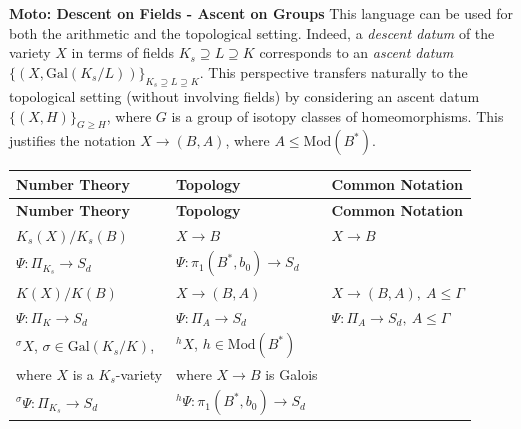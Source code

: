 \documentclass[10pt]{amsart}
\theoremstyle{definition}
\newcommand{\Gal}{{ \mathrm{Gal}}}
\begin{document}
\vspace{0.25 cm}

\textbf{Moto: Descent on Fields - Ascent on Groups} \newline
This language can be used for both the arithmetic and the topological setting. Indeed, a {\em descent datum} of the variety $X$ in terms of fields 
$K_s \supseteq L \supseteq K$ corresponds to an {\em ascent datum} $\{(X,\Gal(K_s/L))\}_{K_s \supseteq L \supseteq K}$. 
This perspective transfers naturally to the topological setting (without involving fields) by considering an ascent datum $\{(X,H)\}_{G\geq H}$, where $G$ is a group of isotopy classes of homeomorphisms. This justifies the notation $X\rightarrow (B,A)$, where $A\leq \mathrm{Mod}(B^*)$.




{\small
\begin{longtable}[c]{>{\raggedright\arraybackslash}p{4.9cm}  >{\raggedright\arraybackslash}p{4.3cm}  >{\raggedright\arraybackslash}p{3.1cm}}
\rowcolor{headerblue}
\textbf{Number Theory} & \textbf{Topology} & \textbf{Common Notation} \\
\endfirsthead

\rowcolor{headerblue}
\textbf{Number Theory} & \textbf{Topology} & \textbf{Common Notation} \\
\endhead

$K_s(X)/K_s(B)$ & $X\rightarrow B$ & $X\rightarrow B$  \\

\rowcolor{rowgray}
$\Psi \colon \Pi_{K_s} \rightarrow S_d$ 
  & $\Psi \colon \pi_1(B^*,b_0) \rightarrow S_d$ 
  & \\
  
$K(X)/K(B)$ 
  & $X\rightarrow (B,A)$ 
  & $X\rightarrow (B,A), \ A\leq \mathfrak{\Gamma}$
  \\ 


\rowcolor{rowgray}
$\Psi\colon \Pi_K\rightarrow S_d$
& $\Psi \colon \Pi_A \rightarrow S_d$ 
& $\Psi \colon \Pi_A \rightarrow S_d, \ A\leq \mathfrak{\Gamma}$
\\

$^\sigma \! X$, $\sigma \in \Gal(K_s/K)$,
  & $^h \! X$, $h \in \mathrm{Mod}(B^*)$ 
  & \\
  
where $X$ is a $K_s$-variety 
& where $X\rightarrow B$ is Galois 
&
\\

\rowcolor{rowgray}
 $^\sigma\Psi \colon \Pi_{K_s}\rightarrow S_d$
  & $^h\Psi \colon \pi_1(B^*,b_0) \rightarrow S_d$
  & \\
\end{longtable}
}
\end{document}
